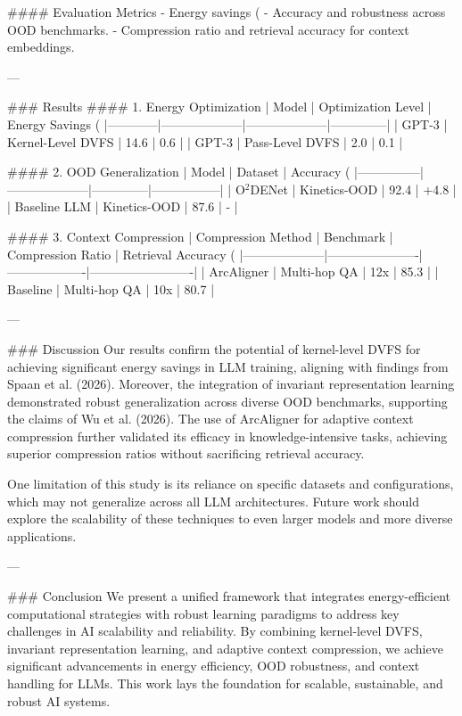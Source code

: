 #### Evaluation Metrics
- Energy savings (%
- Accuracy and robustness across OOD benchmarks.
- Compression ratio and retrieval accuracy for context embeddings.

---

### Results
#### 1. Energy Optimization
| Model      | Optimization Level | Energy Savings (%
|------------|--------------------|--------------------|--------------|
| GPT-3      | Kernel-Level DVFS  | 14.6               | 0.6          |
| GPT-3      | Pass-Level DVFS    | 2.0                | 0.1          |

#### 2. OOD Generalization
| Model         | Dataset            | Accuracy (%
|---------------|--------------------|--------------|-----------------|
| O$^2$DENet    | Kinetics-OOD       | 92.4         | +4.8            |
| Baseline LLM  | Kinetics-OOD       | 87.6         | -               |

#### 3. Context Compression
| Compression Method | Benchmark            | Compression Ratio | Retrieval Accuracy (%
|--------------------|----------------------|-------------------|-------------------------|
| ArcAligner         | Multi-hop QA         | 12x               | 85.3                   |
| Baseline           | Multi-hop QA         | 10x               | 80.7                   |

---

### Discussion
Our results confirm the potential of kernel-level DVFS for achieving significant energy savings in LLM training, aligning with findings from Spaan et al. (2026). Moreover, the integration of invariant representation learning demonstrated robust generalization across diverse OOD benchmarks, supporting the claims of Wu et al. (2026). The use of ArcAligner for adaptive context compression further validated its efficacy in knowledge-intensive tasks, achieving superior compression ratios without sacrificing retrieval accuracy.

One limitation of this study is its reliance on specific datasets and configurations, which may not generalize across all LLM architectures. Future work should explore the scalability of these techniques to even larger models and more diverse applications.

---

### Conclusion
We present a unified framework that integrates energy-efficient computational strategies with robust learning paradigms to address key challenges in AI scalability and reliability. By combining kernel-level DVFS, invariant representation learning, and adaptive context compression, we achieve significant advancements in energy efficiency, OOD robustness, and context handling for LLMs. This work lays the foundation for scalable, sustainable, and robust AI systems.

